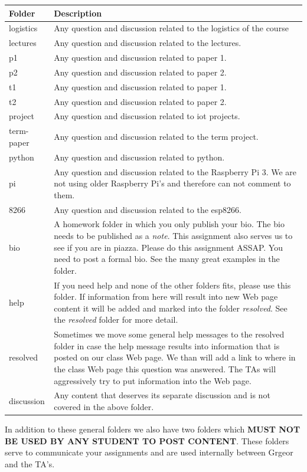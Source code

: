\begin{tabular}{p{2cm}p{11cm}}
Folder & Description \\
\hline
logistics &
Any question and discussion related to the logistics of the course
\\
lectures &
Any question and discussion related to the lectures.
\\
p1 &
Any question and discussion related to paper 1.
\\
p2 &
Any question and discussion related to paper 2.
\\
t1 &
Any question and discussion related to paper 1.
\\
t2 &
Any question and discussion related to paper 2.
\\
project &
Any question and discussion related to iot projects.
\\
term-paper &
Any question and discussion related to the term project.
\\
python &
Any question and discussion related to python.
\\
pi &
Any question and discussion related to the Raspberry Pi 3. We are not
using older Raspberry Pi's and therefore can not comment to them.
\\
8266 &
Any question and discussion related to the esp8266.
\\
bio &
A homework folder in which you only publish your bio. The bio needs to
be published as a \emph{note}. This assignment also serves us to see if
you are in piazza. Please do this assignment ASSAP. You need to post a
formal bio. See the many great examples in the folder.
\\
help &
If you need help and none of the other folders fits, please use this
folder. If information from here will result into new Web page content
it will be added and marked into the folder \emph{resolved}. See the
\emph{resolved} folder for more detail.
\\
resolved &
Sometimes we move some general help messages to the resolved folder in
case the help message results into information that is posted on our
class Web page. We than will add a link to where in the class Web page
this question was answered. The TAs will aggressively try to put
information into the Web page.
\\
discussion &
Any content that deserves its separate discussion and is not covered in
the above folder. \\
\hline
\end{tabular}

In addition to these general folders we also have two folders which
\textbf{MUST NOT BE USED BY ANY STUDENT TO POST CONTENT}. These folders
serve to communicate your assignments and are used internally between
Grgeor and the TA's.

